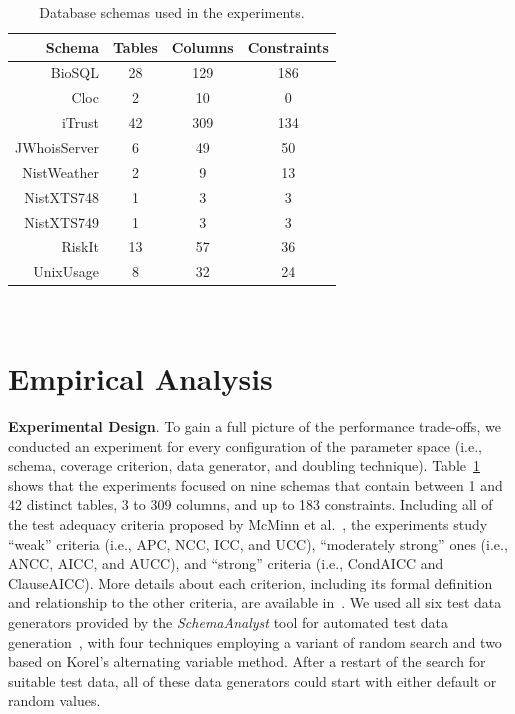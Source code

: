 
\begin{table}[t]
  \centering

  {\normalsize
  \begin{tabular}{r | c c c}
                           Schema & Tables & Columns & Constraints \\ \hline
    BioSQL                        & 28     & 129     & 186 \\
    Cloc                          & 2      & 10      & 0 \\
    iTrust                        & 42     & 309     & 134 \\
    JWhoisServer                  & 6      & 49      & 50 \\
    NistWeather                   & 2      & 9       & 13 \\
    NistXTS748                    & 1      & 3       & 3 \\
    NistXTS749                    & 1      & 3       & 3 \\
    RiskIt                        & 13     & 57      & 36 \\
    UnixUsage                     & 8      & 32      & 24
\end{tabular}}

  \vspace*{-.05in}
  \caption{Database schemas used in the experiments.}~\label{tab:schemas}
  \vspace*{-.25in}

\end{table}

\vspace{-.05in}
\section{Empirical Analysis}
\vspace{-.05in}

\textbf{Experimental Design}. To gain a full picture of the performance trade-offs, we conducted an experiment for every
configuration of the parameter space (i.e., schema, coverage criterion, data generator, and doubling technique).
Table~\ref{tab:schemas} shows that the experiments focused on nine schemas that contain between 1 and 42 distinct
tables, 3 to 309 columns, and up to 183 constraints. Including all of the test adequacy criteria proposed by McMinn et
al.~\cite{mcminn2015}, the experiments study ``weak'' criteria (i.e., APC, NCC, ICC, and UCC), ``moderately strong''
ones (i.e., ANCC, AICC, and AUCC), and ``strong'' criteria (i.e., CondAICC and ClauseAICC). More details about each
criterion, including its formal definition and relationship to the other criteria, are available in~\cite{mcminn2015}. We
used all six test data generators provided by the {\em SchemaAnalyst} tool for automated test data
generation~\cite{kapfhammer2013}, with four techniques employing a variant of random search and two based on Korel's
alternating variable method. After a restart of the search for suitable test data, all of these data generators could
start with either default or random values.


